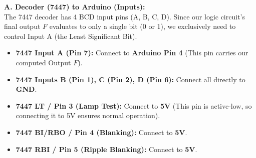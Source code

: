 \documentclass[12pt, a4paper]{article}
\begin{document}
\begin{hardwarebox}
																																																																																																																																																														          \vspace{0.2cm}
																																																																																																																																																															      \textbf{A. Decoder (7447) to Arduino (Inputs):} \\
																																																																																																																																																															          The 7447 decoder has 4 BCD input pins (A, B, C, D). Since our logic circuit's final output $F$ evaluates to only a single bit (0 or 1), we exclusively need to control Input A (the Least Significant Bit).
																																																																																																																																																																      \begin{itemize}[itemsep=0.1em]
																																																																																																																																																																              \item \textbf{7447 Input A (Pin 7):} Connect to \textbf{Arduino Pin 4} (This pin carries our computed Output $F$).
																																																																																																																																																																	              \item \textbf{7447 Inputs B (Pin 1), C (Pin 2), D (Pin 6):} Connect all directly to \textbf{GND}.
																																																																																																																																																																		              \item \textbf{7447 LT / Pin 3 (Lamp Test):} Connect to \textbf{5V} (This pin is active-low, so connecting it to 5V ensures normal operation).
																																																																																																																																																																			              \item \textbf{7447 BI/RBO / Pin 4 (Blanking):} Connect to \textbf{5V}.
																																																																																																																																																																				              \item \textbf{7447 RBI / Pin 5 (Ripple Blanking):} Connect to \textbf{5V}.

\end{itemize}
\end{hardwarebox}
\end{document}

